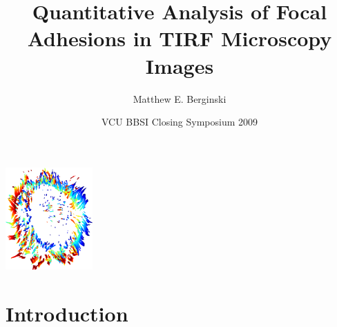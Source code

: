 \documentclass{beamer}
\title[FA Characterization]{Quantitative Analysis of Focal Adhesions in TIRF
Microscopy Images}
\author[] %
{Matthew E. Berginski}
\institute[]{University of North Carolina at Chapel Hill}
\date[VCU BBSI Closing Symposium 2009]{VCU BBSI Closing Symposium 2009}
\begin{document}
\begin{frame}
	\titlepage
	\begin{center}
	\includegraphics[width=0.25\textwidth]{ghost}
	\end{center}
\end{frame}

\section{Introduction}
\end{document}

